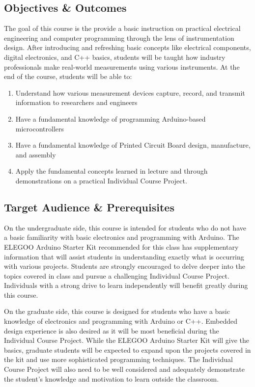     \subsection*{Objectives \& Outcomes}
    The goal of this course is the provide a basic instruction on practical electrical engineering and computer programming through the lens of instrumentation design. 
    After introducing and refreshing basic concepts like electrical components, digital electronics, and C++ basics, students will be taught how industry professionals make real-world measurements using various instruments. At the end of the course, students will be able to:
    \begin{enumerate}
        \item Understand how various measurement devices capture, record, and transmit information to researchers and engineers
        \item Have a fundamental knowledge of programming Arduino-based microcontrollers
        \item Have a fundamental knowledge of Printed Circuit Board design, manufacture, and assembly
        \item Apply the fundamental concepts learned in lecture and through demonstrations on a practical Individual Course Project.
    \end{enumerate}

    \subsection*{Target Audience \& Prerequisites}
    On the undergraduate side, this course is intended for students who do not have a basic familiarity with basic electronics and programming with Arduino. 
    The ELEGOO Arduino Starter Kit recommended for this class has supplementary information that will assist students in understanding exactly what is occurring with various projects. 
    Students are strongly encouraged to delve deeper into the topics covered in class and pursue a challenging Individual Course Project. 
    Individuals with a strong drive to learn independently will benefit greatly during this course.

    On the graduate side, this course is designed for students who have a basic knowledge of electronics and programming with Arduino or C++. 
    Embedded design experience is also desired as it will be most beneficial during the Individual Course Project. 
    While the ELEGOO Arduino Starter Kit will give the basics, graduate students will be expected to expand upon the projects covered in the kit and use more sophisticated programming techniques. 
    The Individual Course Project will also need to be well considered and adequately demonstrate the student's knowledge and motivation to learn outside the classroom.

